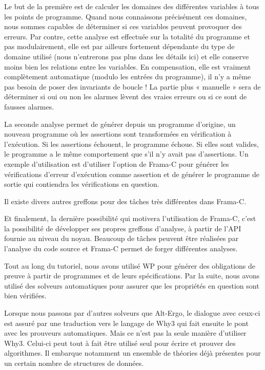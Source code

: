 Le but de la première est de calculer les domaines des différentes variables à
tous les points de programme. Quand nous connaissons précisément ces domaines,
nous sommes capables de déterminer si ces variables peuvent provoquer des erreurs.
Par contre, cette analyse est effectuée sur la totalité du programme et pas
modulairement, elle est par ailleurs fortement dépendante du type de domaine
utilisé (nous n'entrerons pas plus dans les détails ici) et elle conserve moins
bien les relations entre les variables. En compensation, elle est vraiment
complètement automatique (modulo les entrées du programme), il n'y a même pas
besoin de poser des invariants de boucle ! La partie plus « manuelle » sera de
déterminer si oui ou non les alarmes lèvent des vraies erreurs ou si ce sont de
fausses alarmes.



La seconde analyse permet de générer depuis un programme d'origine, un nouveau
programme où les assertions sont transformées en vérification à l'exécution. Si
les assertions échouent, le programme échoue. Si elles sont valides, le programme
a le même comportement que s'il n'y avait pas d'assertions. Un exemple
d'utilisation est d'utiliser l'option  de Frama-C pour générer les
vérifications d'erreur d'exécution comme assertion et de générer le programme de
sortie qui contiendra les vérifications en question.



Il existe divers autres greffons pour des tâches très différentes dans Frama-C.


Et finalement, la dernière possibilité qui motivera l'utilisation de Frama-C,
c'est la possibilité de développer ses propres greffons d'analyse, à partir de
l'API fournie au niveau du noyau. Beaucoup de tâches peuvent être réalisées par
l'analyse du code source et Frama-C permet de forger différentes analyses.





Tout au long du tutoriel, nous avons utilisé WP pour générer des obligations de
preuve à partir de programmes et de leurs spécifications. Par la suite, nous avons
utilisé des solveurs automatiques pour assurer que les propriétés en question sont
bien vérifiées.



Lorsque nous passons par d'autres solveurs que Alt-Ergo, le dialogue avec ceux-ci
est assuré par une traduction vers le langage de Why3 qui fait ensuite le pont
avec les prouveurs automatiques. Mais ce n'est pas la seule manière d'utiliser
Why3. Celui-ci peut tout à fait être utilisé seul pour écrire et prouver des
algorithmes. Il embarque notamment un ensemble de théories déjà présentes pour un
certain nombre de structures de données.



